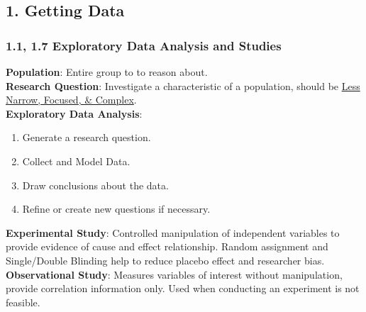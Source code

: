 \begin{multicols*}{3}
\setlength{\premulticols}{1pt}
\setlength{\postmulticols}{1pt}
\setlength{\multicolsep}{1pt}
\setlength{\columnsep}{2pt}

\subsection{1. Getting Data}
\subsubsection{1.1, 1.7 Exploratory Data Analysis and Studies}
\textbf{Population}: Entire group to to reason about.\\
\textbf{Research Question}:  Investigate a characteristic of a population, should be \underline{Less Narrow, Focused, \& Complex}.\\
\textbf{Exploratory Data Analysis}:
\begin{enumerate}
    \item Generate a research question.
    \item Collect and Model Data.
    \item Draw conclusions about the data.
    \item Refine or create new questions if necessary.
\end{enumerate}
\textbf{Experimental Study}: Controlled manipulation of independent variables to provide evidence of cause and effect relationship. Random assignment and Single/Double Blinding help to reduce placebo effect and researcher bias.\\
\textbf{Observational Study}: Measures variables of interest without manipulation, provide correlation information only. Used when conducting an experiment is not feasible.



\end{multicols*}
